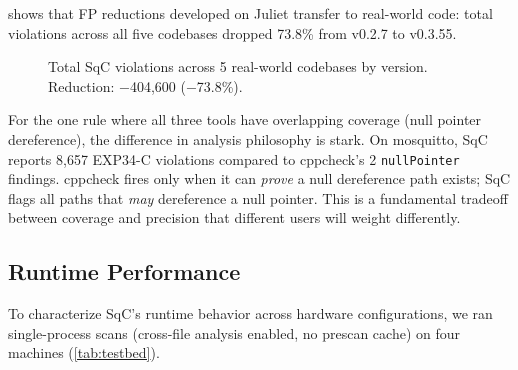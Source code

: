 \documentclass[10pt,twocolumn,letterpaper]{article}
\begin{document}
 shows that FP reductions developed on
Juliet transfer to real-world code: total violations across all five
codebases dropped 73.8\% from v0.2.7 to v0.3.55.

\begin{figure}[t]
\centering
{}
\caption{Total SqC violations across 5 real-world codebases by
version.  Reduction: $-$404,600 ($-$73.8\%).}
\label{fig:realworld-reduction}
\end{figure}

For the one rule where all three tools have overlapping coverage
(null pointer dereference), the difference in analysis philosophy is
stark.  On mosquitto, SqC reports 8,657 EXP34-C violations compared
to cppcheck's 2 \texttt{nullPointer} findings.  cppcheck fires only
when it can \emph{prove} a null dereference path exists; SqC flags all
paths that \emph{may} dereference a null pointer.  This is a
fundamental tradeoff between coverage and precision that different users
will weight differently.

\subsection{Runtime Performance}
\label{sec:runtime}

To characterize SqC's runtime behavior across hardware configurations,
we ran single-process scans (cross-file analysis enabled, no prescan
cache) on four machines (\cref{tab:testbed}).
\end{document}
